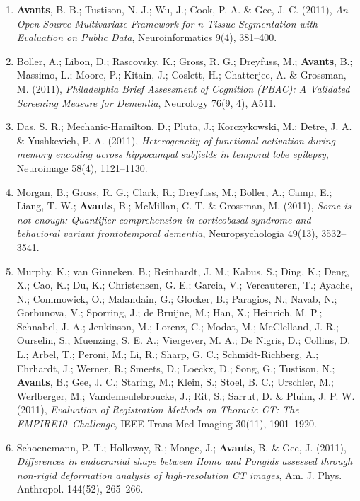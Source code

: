 \documentclass[11pt]{moderncv} %
\begin{document}
\begin{enumerate}
\item  \textbf{Avants}, B. B.; Tustison, N. J.; Wu, J.; Cook, P. A. \&  Gee, J. C. (2011), \textit{An Open Source Multivariate Framework for n-Tissue Segmentation with Evaluation on Public Data}, Neuroinformatics 9(4), 381--400.

\item  Boller, A.; Libon, D.; Rascovsky, K.; Gross, R. G.; Dreyfuss, M.; \textbf{Avants}, B.; Massimo, L.; Moore, P.; Kitain, J.; Coslett, H.; Chatterjee, A. \&  Grossman, M. (2011), \textit{Philadelphia Brief Assessment of Cognition (PBAC): A Validated Screening Measure for Dementia}, Neurology 76(9, 4), A511.

\item  Das, S. R.; Mechanic-Hamilton, D.; Pluta, J.; Korczykowski, M.; Detre, J. A. \&  Yushkevich, P. A. (2011), \textit{Heterogeneity of functional activation during memory encoding across hippocampal subfields in temporal lobe epilepsy}, Neuroimage 58(4), 1121--1130.

\item  Morgan, B.; Gross, R. G.; Clark, R.; Dreyfuss, M.; Boller, A.; Camp, E.; Liang, T.-W.; \textbf{Avants}, B.; McMillan, C. T. \&  Grossman, M. (2011), \textit{Some is not enough: Quantifier comprehension in corticobasal syndrome and behavioral variant frontotemporal dementia}, Neuropsychologia 49(13), 3532--3541.

\item  Murphy, K.; van Ginneken, B.; Reinhardt, J. M.; Kabus, S.; Ding, K.; Deng, X.; Cao, K.; Du, K.; Christensen, G. E.; Garcia, V.; Vercauteren, T.; Ayache, N.; Commowick, O.; Malandain, G.; Glocker, B.; Paragios, N.; Navab, N.; Gorbunova, V.; Sporring, J.; de Bruijne, M.; Han, X.; Heinrich, M. P.; Schnabel, J. A.; Jenkinson, M.; Lorenz, C.; Modat, M.; McClelland, J. R.; Ourselin, S.; Muenzing, S. E. A.; Viergever, M. A.; De Nigris, D.; Collins, D. L.; Arbel, T.; Peroni, M.; Li, R.; Sharp, G. C.; Schmidt-Richberg, A.; Ehrhardt, J.; Werner, R.; Smeets, D.; Loeckx, D.; Song, G.; Tustison, N.; \textbf{Avants}, B.; Gee, J. C.; Staring, M.; Klein, S.; Stoel, B. C.; Urschler, M.; Werlberger, M.; Vandemeulebroucke, J.; Rit, S.; Sarrut, D. \&  Pluim, J. P. W. (2011), \textit{Evaluation of Registration Methods on Thoracic CT: The EMPIRE10~Challenge}, IEEE Trans Med Imaging 30(11), 1901--1920.

\item  Schoenemann, P. T.; Holloway, R.; Monge, J.; \textbf{Avants}, B. \&  Gee, J. (2011), \textit{Differences in endocranial shape between Homo and Pongids assessed through non-rigid deformation analysis of high-resolution CT images}, Am. J. Phys. Anthropol. 144(52), 265--266.


\end{enumerate}
\end{document}
